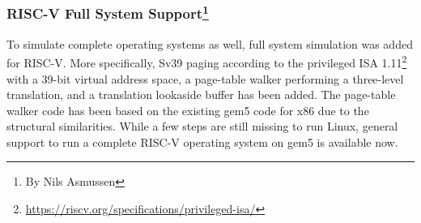 \subsubsection[RISC-V Full System Support]{RISC-V Full System Support\footnote{By Nils Asmussen}}

To simulate complete operating systems as well, full system simulation was added for RISC-V.
More specifically, Sv39 paging according to the privileged ISA 1.11\footnote{\url{https://riscv.org/specifications/privileged-isa/}} with a 39-bit virtual address space, a page-table walker performing a three-level translation, and a translation lookaside buffer has been added.
The page-table walker code has been based on the existing gem5 code for x86 due to the structural similarities.
While a few steps are still missing to run Linux, general support to run a complete RISC-V operating system on gem5 is available now.

